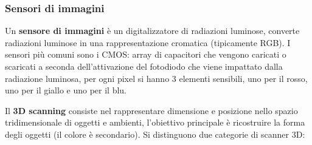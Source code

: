 \subsubsection*{Sensori di immagini}
Un \textbf{sensore di immagini} è un digitalizzatore di radiazioni luminose, converte radiazioni luminose in una rappresentazione cromatica (tipicamente
RGB). I sensori più comuni sono i CMOS: array di capacitori che vengono caricati o scaricati a seconda dell'attivazione del fotodiodo che viene
impattato dalla radiazione luminosa, per ogni pixel si hanno 3 elementi sensibili, uno per il rosso, uno per il giallo e uno per il blu.

Il \textbf{3D scanning} consiste nel rappresentare dimensione e posizione nello spazio tridimensionale di oggetti e ambienti, l'obiettivo principale
è ricostruire la forma degli oggetti (il colore è secondario). Si distinguono due categorie di scanner 3D:

